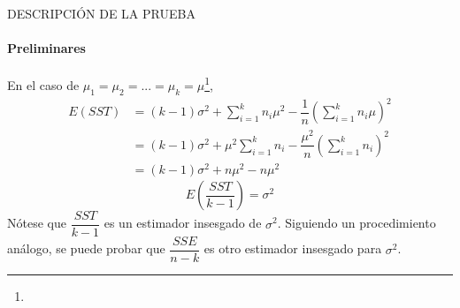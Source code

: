 \begin{frame}{DESCRIPCIÓN DE LA PRUEBA}
\framesubtitle{Preliminares}
En el caso de $\mu_1=\mu_2=...=\mu_k=\mu$\footnote{}, 
\begin{equation*}
    \begin{split}
        E(SST)&=(k-1)\sigma^2+\sum_{i=1}^kn_i\mu^2-\dfrac{1}{n}\left(\sum_{i=1}^kn_i\mu\right)^2\\
        &=(k-1)\sigma^2+\mu^2\sum_{i=1}^kn_i-\dfrac{\mu^2}{n}\left(\sum_{i=1}^kn_i\right)^2\\
        &=(k-1)\sigma^2+n\mu^2-n\mu^2
    \end{split}
\end{equation*}
    \begin{equation}
        E\left(\dfrac{SST}{k-1}\right)=\sigma^2
    \end{equation}
    Nótese que $\dfrac{SST}{k-1}$ es un estimador insesgado de $\sigma^2$. Siguiendo un procedimiento análogo, se puede probar que $\dfrac{SSE}{n-k}$ es otro estimador insesgado para $\sigma^2$.
\end{frame}


    